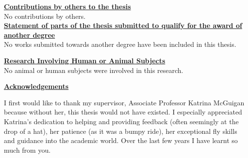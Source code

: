 







\noindent\textbf{\underline{Contributions by others to the thesis}}\\
\bigskip
\noindent 
No contributions by others.\\

\vspace{36pt}
\noindent\textbf{\underline{Statement of parts of the thesis submitted to qualify for the award of another degree}}\\
\bigskip
\noindent 
No works submitted towards another degree have been included in this thesis.\\
\vspace{36pt}

\noindent\textbf{\underline{Research Involving Human or Animal Subjects}}\\
\bigskip
\noindent 
No animal or human subjects were involved in this research.\\
\newpage

\noindent\textbf{\underline{Acknowledgements}}\\
\vspace{2cm}

I first would like to thank my supervisor, Associate Professor Katrina McGuigan because without her, this thesis would not have existed. I especially appreciated Katrina's dedication to helping and providing feedback (often seemingly at the drop of a hat), her patience (as it was a bumpy ride), her exceptional fly skills and guidance into the academic world. Over the last few years I have learnt so much from you.\par

